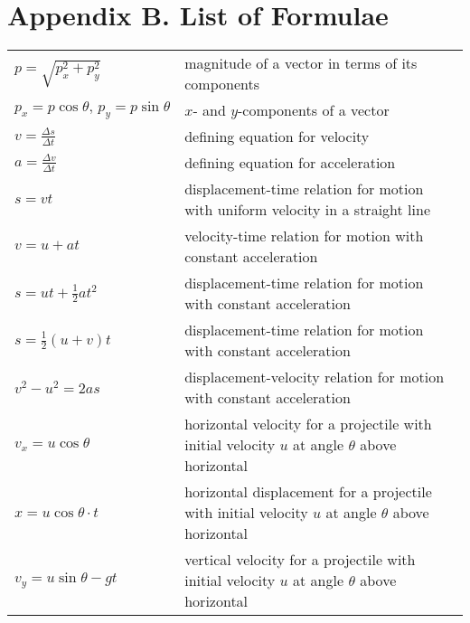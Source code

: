 \section*{Appendix B. List of Formulae}

\vspace*{-2em}
	{
		{
			\scriptsize

\begin{longtable}{p{} p{}}

$p=\sqrt{p_x^2 + p_y^2}$ & magnitude of a vector in terms of its components \\

$p_x = p\cos\theta, \, p_y = p\sin\theta$ & $x$- and $y$-components of a vector \\

$v = \frac{\Delta s}{\Delta t}$ & defining equation for velocity \\

$a = \frac{\Delta v}{\Delta t}$ & defining equation for acceleration \\

$s=vt$ & displacement-time relation for motion with uniform velocity in a straight line \\

$v=u+at$ & velocity-time relation for motion with constant acceleration \\

$s=ut+\frac{1}{2}at^2$ & displacement-time relation for motion with constant acceleration \\

$s=\frac{1}{2}(u+v)t$ & displacement-time relation for motion with constant acceleration \\

$v^2 - u^2 = 2as$ & displacement-velocity relation for motion with constant acceleration \\

$v_x = u\cos\theta$ & horizontal velocity for a projectile with initial velocity $u$ at angle $\theta$ above horizontal \\

$x = u\cos\theta \cdot t$ & horizontal displacement for a projectile with initial velocity $u$ at angle $\theta$ above horizontal \\

$v_y = u \sin\theta  - gt$ & vertical velocity for a projectile with initial velocity $u$ at angle $\theta$ above horizontal \\


\end{longtable}}}
